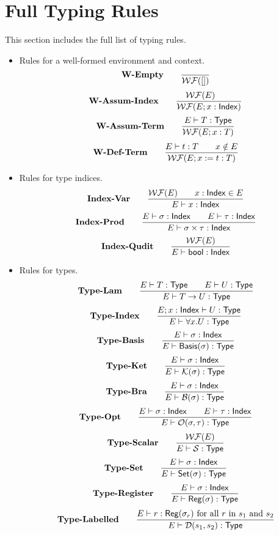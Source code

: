 
\section{Full Typing Rules}

\label{sec: full typing rules}

This section includes the full list of typing rules.

\begin{itemize}
    \item Rules for a well-formed environment and context.
    \[
        \textbf{W-Empty} \qquad
        \frac{}{\mathcal{WF}([])}
    \]
    \[
        \textbf{W-Assum-Index} \qquad
        \frac{\mathcal{WF}(E) \qquad}{\mathcal{WF}(E; x : \mathsf{Index})}
    \]
    \[
        \textbf{W-Assum-Term} \qquad
        \frac{E \vdash T : \mathsf{Type}}{\mathcal{WF}(E; x:T)}
    \]
    \[
        \textbf{W-Def-Term} \qquad
        \frac{E \vdash t:T \qquad x \notin E}{\mathcal{WF}(E; x:=t:T)}
    \]

    \item Rules for type indices.
    \[
        \textbf{Index-Var} \qquad
        \frac{\mathcal{WF}(E) \qquad x : \mathsf{Index} \in E}{E \vdash x : \mathsf{Index}}
    \]
    \[
        \textbf{Index-Prod} \qquad
        \frac{E \vdash \sigma : \mathsf{Index} \qquad E \vdash \tau : \mathsf{Index}}{E \vdash \sigma \times \tau : \mathsf{Index}}
    \]
    \[
        \textbf{Index-Qudit} \qquad
        \frac{\mathcal{WF}(E)}{E \vdash \mathsf{bool} : \mathsf{Index}}
    \]


    \item Rules for types.
    \[
        \textbf{Type-Lam} \qquad
        \frac{E \vdash T : \mathsf{Type} \qquad E \vdash U : \mathsf{Type}}{E \vdash T \to U : \mathsf{Type}}
    \]
    \[
        \textbf{Type-Index} \qquad
        \frac{E; x : \mathsf{Index} \vdash U : \mathsf{Type}}{E \vdash \forall x.U : \mathsf{Type}}
    \]
    \[
        \textbf{Type-Basis} \qquad
        \frac{E \vdash \sigma : \mathsf{Index}}{E \vdash \mathsf{Basis}(\sigma) : \mathsf{Type}}
    \]
    \[
        \textbf{Type-Ket} \qquad
        \frac{E \vdash \sigma : \mathsf{Index}}{E \vdash \mathcal{K}(\sigma) : \mathsf{Type}}
    \]
    \[
        \textbf{Type-Bra} \qquad
        \frac{E \vdash \sigma : \mathsf{Index}}{E \vdash \mathcal{B}(\sigma) : \mathsf{Type}}
    \]
    \[
        \textbf{Type-Opt} \qquad
        \frac{E \vdash \sigma : \mathsf{Index} \qquad E \vdash \tau : \mathsf{Index}}{E \vdash \mathcal{O}(\sigma, \tau) : \mathsf{Type}}
    \]
    \[
        \textbf{Type-Scalar} \qquad
        \frac{\mathcal{WF}(E)}{E \vdash \mathcal{S} : \mathsf{Type}}
    \]
    \[
        \textbf{Type-Set} \qquad
        \frac{E \vdash \sigma : \mathsf{Index}}{E \vdash \mathsf{Set}(\sigma) : \mathsf{Type}}
    \]
    \[
        \textbf{Type-Register} \qquad
        \frac{E \vdash  \sigma : \mathsf{Index}}{E \vdash \mathsf{Reg}(\sigma) : \mathsf{Type}}
    \]
    \[
        \textbf{Type-Labelled} \qquad
        \frac{E \vdash r : \mathsf{Reg}(\sigma_r) \text{ for all $r$ in $s_1$ and $s_2$} }{E \vdash \mathcal{D}(s_1, s_2) : \textsf{Type}} 
    \]


\end{itemize}
